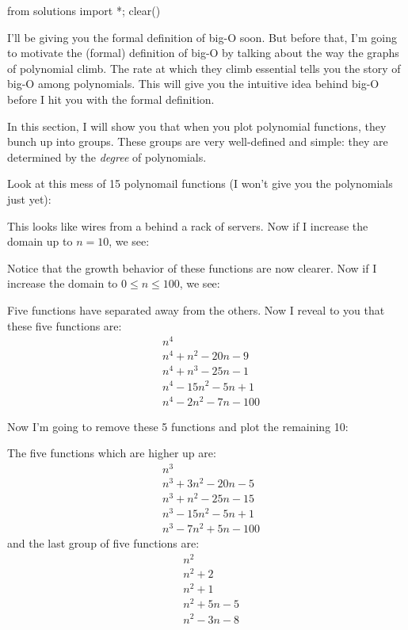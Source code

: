 \begin{python0}
from solutions import *; clear()
\end{python0}

I'll be giving you the formal definition of big-O soon.
But before that, I'm going to motivate the (formal) definition of big-O
by talking about the way the graphs of polynomial climb.
The rate at which they climb essential tells you the story of big-O among 
polynomials.
This will give you the intuitive idea behind big-O before I hit you
with the formal definition.

In this section, I will show you that when you plot polynomial functions,
they bunch up into groups.
These groups are very well-defined and simple:
they are determined by the \textit{degree} of polynomials.

Look at this mess of 15 polynomail functions 
(I won't give you the polynomials just yet):


This looks like wires from a behind a rack of servers.
Now if I increase the domain up to $n = 10$, we see:


Notice that the growth behavior of these functions are now clearer.
Now if I increase the domain to $0 \leq n \leq 100$, we see:


Five functions have separated away from the others.
Now I reveal to you that these five functions are:
\begin{align*}
&n^4 \\
&n^4 + n^2 - 20n - 9 \\
&n^4 +  n^3 - 25n - 1 \\
&n^4 - 15n^2 - 5n + 1 \\
&n^4 - 2n^2 - 7n - 100
\end{align*}

Now I'm going to remove these 5 functions and plot the remaining 10:


The five functions which are higher up are:
\begin{align*}
&n^3 \\
&n^3 + 3n^2 - 20n - 5 \\
&n^3 +   n^2 - 25n - 15 \\
&n^3 - 15n^2 - 5n + 1 \\
&n^3 - 7n^2 + 5n - 100
\end{align*}
and the last group of five functions are:
\begin{align*}
&n^2 \\
&n^2 + 2 \\
&n^2 + 1 \\
&n^2 + 5n - 5 \\
&n^2 - 3n - 8
\end{align*}


